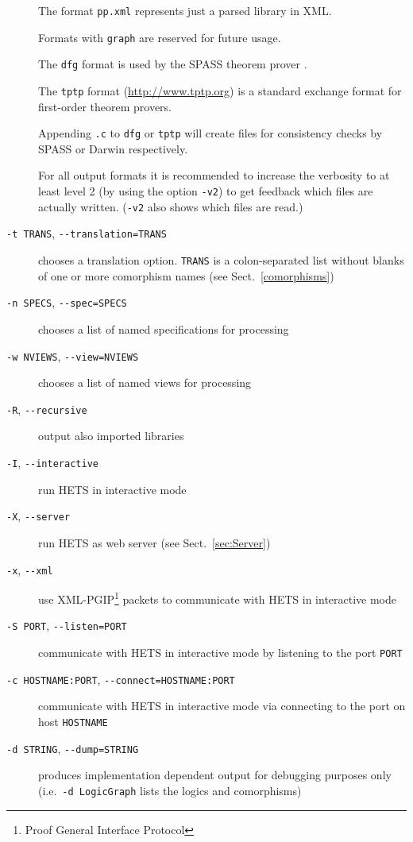\documentclass{article}
\newcommand{\normalTEXTSC}[2]{{#1\scriptsize#2}}
\newcommand     {\Hets}{\normalTEXTSC{H}{ETS}\xspace}
\newcommand     {\SPASS}{\normalTEXTSC{S}{PASS}\xspace}
\begin{document}
\begin{description}
The format \texttt{pp.xml} represents just a parsed library in XML.

Formats with \texttt{graph} are reserved for future usage.

The \texttt{dfg} format is used by the \SPASS theorem prover
\cite{WeidenbachEtAl02}.

The \texttt{tptp} format (\url{http://www.tptp.org}) is a standard
exchange format for first-order theorem provers.

Appending \texttt{.c} to \texttt{dfg} or \texttt{tptp} will create files for
consistency checks by SPASS or Darwin respectively.

For all output formats it is recommended to increase the verbosity to at least
level 2 (by using the option \texttt{-v2}) to get feedback which files are
actually written. (\texttt{-v2} also shows which files are read.)

\item[\texttt{-t TRANS}, \texttt{-{}-translation=TRANS}]
chooses a translation option. \texttt{TRANS} is a colon-separated list
without blanks of one or more comorphism names (see Sect.~\ref{comorphisms})

\item[\texttt{-n SPECS}, \texttt{-{}-spec=SPECS}]
chooses a list of named specifications for processing

\item[\texttt{-w NVIEWS}, \texttt{-{}-view=NVIEWS}]
chooses a list of named views for processing

\item[\texttt{-R}, \texttt{-{}-recursive}] output also imported libraries

\item[\texttt{-I}, \texttt{-{}-interactive}] run \Hets in interactive mode

\item[\texttt{-X}, \texttt{-{}-server}] run \Hets as web server (see
  Sect.~\ref{sec:Server})

\item[\texttt{-x}, \texttt{-{}-xml}] use XML-PGIP\footnote{Proof General Interface Protocol} packets to communicate with
  \Hets in interactive mode

\item[\texttt{-S PORT}, \texttt{-{}-listen=PORT}] communicate
  with \Hets in interactive mode by listening to the port \texttt{PORT}

\item[\texttt{-c HOSTNAME:PORT}, \texttt{-{}-connect=HOSTNAME:PORT}] communicate
  with \Hets in interactive mode via connecting to the port on host
  \texttt{HOSTNAME}

\item[\texttt{-d STRING}, \texttt{-{}-dump=STRING}] produces implementation
  dependent output for debugging purposes only
  (i.e.\ \texttt{-d LogicGraph} lists the logics and comorphisms)
\end{description}
\end{document}
